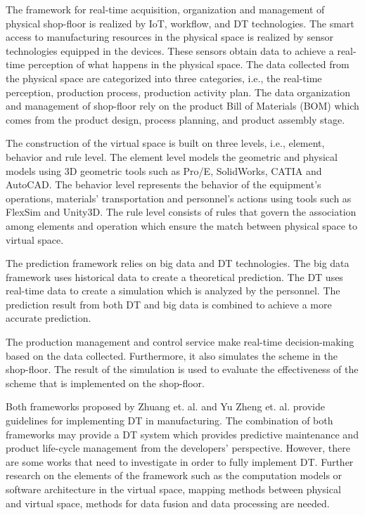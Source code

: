 \documentclass[article]{aaltoseries}
\begin{document}
The framework for real-time acquisition, organization and management of physical shop-floor is realized by IoT, workflow, and DT technologies. The smart access to manufacturing resources in the physical space is realized by sensor technologies equipped in the devices. These sensors obtain data to achieve a real-time perception of what happens in the physical space. The data collected from the physical space are categorized into three categories, i.e., the real-time perception, production process, production activity plan. The data organization and management of shop-floor rely on the product Bill of Materials (BOM) which comes from the product design, process planning, and product assembly stage.

The construction of the virtual space is built on three levels, i.e., element, behavior and rule level. The element level models the geometric and physical models using 3D geometric tools such as Pro/E, SolidWorks, CATIA and AutoCAD. The behavior level represents the behavior of the equipment's operations, materials' transportation and personnel's actions using tools such as FlexSim and Unity3D. The rule level consists of rules that govern the association among elements and operation which ensure the match between physical space to virtual space.

The prediction framework relies on big data and DT technologies. The big data framework uses historical data to create a theoretical prediction. The DT uses real-time data to create a simulation which is analyzed by the personnel. The prediction result from both DT and big data is combined to achieve a more accurate prediction.

The production management and control service make real-time decision-making based on the data collected. Furthermore, it also simulates the scheme in the shop-floor. The result of the simulation is used to evaluate the effectiveness of the scheme that is implemented on the shop-floor.

Both frameworks proposed by Zhuang et. al. and Yu Zheng et. al. provide guidelines for implementing DT in manufacturing. The combination of both frameworks may provide a DT system which provides predictive maintenance and product life-cycle management from the developers' perspective. However, there are some works that need to investigate in order to fully implement DT. Further research on the elements of the framework such as the computation models or software architecture in the virtual space, mapping methods between physical and virtual space, methods for data fusion and data processing are needed.
\end{document}
